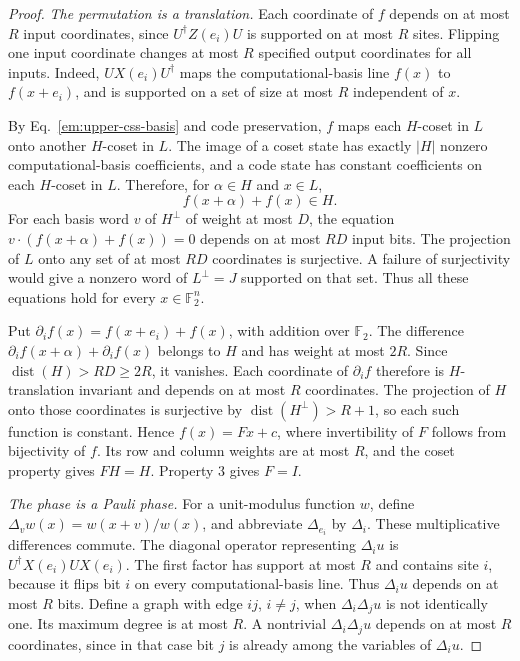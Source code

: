 \documentclass[aps,prl,reprint,notitlepage,nofootinbib,nobibnotes]{revtex4-2}
\begin{document}
\begin{proof}
\emph{The permutation is a translation.}
Each coordinate of \(f\) depends on at most \(R\) input coordinates, since \(U^\dagger Z(e_i)U\) is supported on at most \(R\) sites. Flipping one input coordinate changes at most \(R\) specified output coordinates for all inputs. Indeed, \(UX(e_i)U^\dagger\) maps the computational-basis line \(f(x)\) to \(f(x+e_i)\), and is supported on a set of size at most \(R\) independent of \(x\).

By Eq.~\eqref{em:upper-css-basis} and code preservation, \(f\) maps each \(H\)-coset in \(L\) onto another \(H\)-coset in \(L\). The image of a coset state has exactly \(|H|\) nonzero computational-basis coefficients, and a code state has constant coefficients on each \(H\)-coset in \(L\). Therefore, for \(\alpha\in H\) and \(x\in L\),
\[
 f(x+\alpha)+f(x)\in H .
\]
For each basis word \(v\) of \(H^\perp\) of weight at most \(D\), the equation \(v\cdot(f(x+\alpha)+f(x))=0\) depends on at most \(RD\) input bits. The projection of \(L\) onto any set of at most \(RD\) coordinates is surjective. A failure of surjectivity would give a nonzero word of \(L^\perp=J\) supported on that set. Thus all these equations hold for every \(x\in\mathbb F_2^n\).

Put \(\partial_i f(x)=f(x+e_i)+f(x)\), with addition over \(\mathbb F_2\). The difference \(\partial_i f(x+\alpha)+\partial_i f(x)\) belongs to \(H\) and has weight at most \(2R\). Since \(\operatorname{dist}(H)>RD\ge2R\), it vanishes. Each coordinate of \(\partial_i f\) therefore is \(H\)-translation invariant and depends on at most \(R\) coordinates. The projection of \(H\) onto those coordinates is surjective by \(\operatorname{dist}(H^\perp)>R+1\), so each such function is constant. Hence \(f(x)=Fx+c\), where invertibility of \(F\) follows from bijectivity of \(f\). Its row and column weights are at most \(R\), and the coset property gives \(FH=H\). Property 3 gives \(F=I\).

\emph{The phase is a Pauli phase.}
For a unit-modulus function \(w\), define \(\Delta_v w(x)=w(x+v)/w(x)\), and abbreviate \(\Delta_{e_i}\) by \(\Delta_i\). These multiplicative differences commute. The diagonal operator representing \(\Delta_i u\) is \(U^\dagger X(e_i)U X(e_i)\). The first factor has support at most \(R\) and contains site \(i\), because it flips bit \(i\) on every computational-basis line. Thus \(\Delta_i u\) depends on at most \(R\) bits. Define a graph with edge \(ij\), \(i\ne j\), when \(\Delta_i\Delta_j u\) is not identically one. Its maximum degree is at most \(R\). A nontrivial \(\Delta_i\Delta_j u\) depends on at most \(R\) coordinates, since in that case bit \(j\) is already among the variables of \(\Delta_i u\).


\end{proof}
\end{document}
